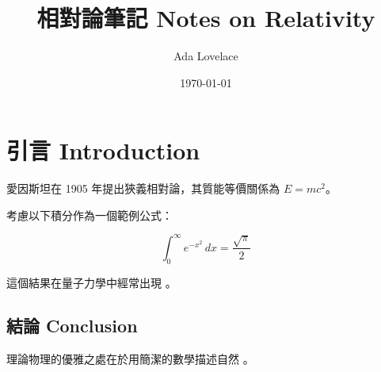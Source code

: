 \documentclass[11pt,a4paper]{article}
\title{相對論筆記 Notes on Relativity}
\author{Ada Lovelace}
\date{\today}
\begin{document}
\maketitle
\begin{abstract}
\end{abstract}
\section{引言 Introduction}

愛因斯坦在 1905 年提出狹義相對論，其質能等價關係為 $E = mc^2$。

考慮以下積分作為一個範例公式：

\[
\int_0^\infty e^{-x^2} \, dx = \frac{\sqrt{\pi}}{2}
\]

這個結果在量子力學中經常出現 \autocite{dirac1930}。

\subsection{結論 Conclusion}

理論物理的優雅之處在於用簡潔的數學描述自然 \autocite[p. 42]{feynman1965}。

\printbibliography
\end{document}
